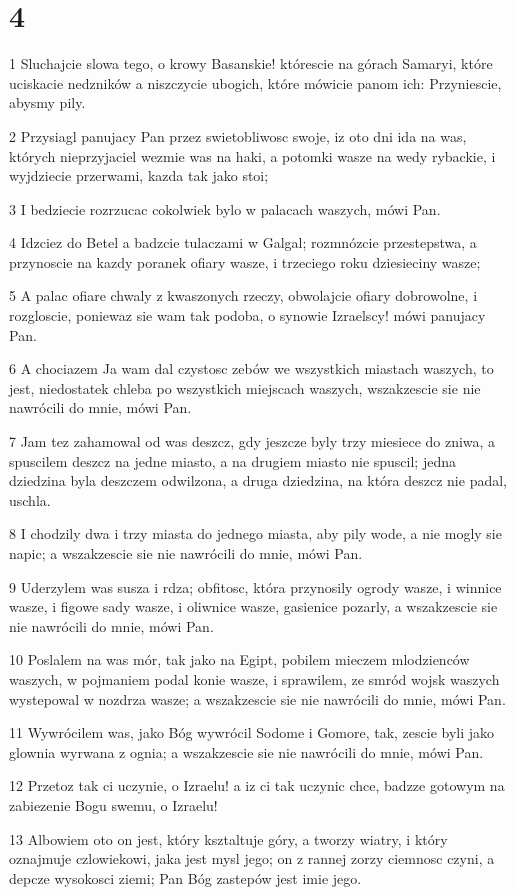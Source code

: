 \chapter{4}

\par 1 Sluchajcie slowa tego, o krowy Basanskie! którescie na górach Samaryi, które uciskacie nedzników a niszczycie ubogich, które mówicie panom ich: Przyniescie, abysmy pily.
\par 2 Przysiagl panujacy Pan przez swietobliwosc swoje, iz oto dni ida na was, których nieprzyjaciel wezmie was na haki, a potomki wasze na wedy rybackie, i wyjdziecie przerwami, kazda tak jako stoi;
\par 3 I bedziecie rozrzucac cokolwiek bylo w palacach waszych, mówi Pan.
\par 4 Idzciez do Betel a badzcie tulaczami w Galgal; rozmnózcie przestepstwa, a przynoscie na kazdy poranek ofiary wasze, i trzeciego roku dziesieciny wasze;
\par 5 A palac ofiare chwaly z kwaszonych rzeczy, obwolajcie ofiary dobrowolne, i rozgloscie, poniewaz sie wam tak podoba, o synowie Izraelscy! mówi panujacy Pan.
\par 6 A chociazem Ja wam dal czystosc zebów we wszystkich miastach waszych, to jest, niedostatek chleba po wszystkich miejscach waszych, wszakzescie sie nie nawrócili do mnie, mówi Pan.
\par 7 Jam tez zahamowal od was deszcz, gdy jeszcze byly trzy miesiece do zniwa, a spuscilem deszcz na jedne miasto, a na drugiem miasto nie spuscil; jedna dziedzina byla deszczem odwilzona, a druga dziedzina, na która deszcz nie padal, uschla.
\par 8 I chodzily dwa i trzy miasta do jednego miasta, aby pily wode, a nie mogly sie napic; a wszakzescie sie nie nawrócili do mnie, mówi Pan.
\par 9 Uderzylem was susza i rdza; obfitosc, która przynosily ogrody wasze, i winnice wasze, i figowe sady wasze, i oliwnice wasze, gasienice pozarly, a wszakzescie sie nie nawrócili do mnie, mówi Pan.
\par 10 Poslalem na was mór, tak jako na Egipt, pobilem mieczem mlodzienców waszych, w pojmaniem podal konie wasze, i sprawilem, ze smród wojsk waszych wystepowal w nozdrza wasze; a wszakzescie sie nie nawrócili do mnie, mówi Pan.
\par 11 Wywrócilem was, jako Bóg wywrócil Sodome i Gomore, tak, zescie byli jako glownia wyrwana z ognia; a wszakzescie sie nie nawrócili do mnie, mówi Pan.
\par 12 Przetoz tak ci uczynie, o Izraelu! a iz ci tak uczynic chce, badzze gotowym na zabiezenie Bogu swemu, o Izraelu!
\par 13 Albowiem oto on jest, który ksztaltuje góry, a tworzy wiatry, i który oznajmuje czlowiekowi, jaka jest mysl jego; on z rannej zorzy ciemnosc czyni, a depcze wysokosci ziemi; Pan Bóg zastepów jest imie jego.

